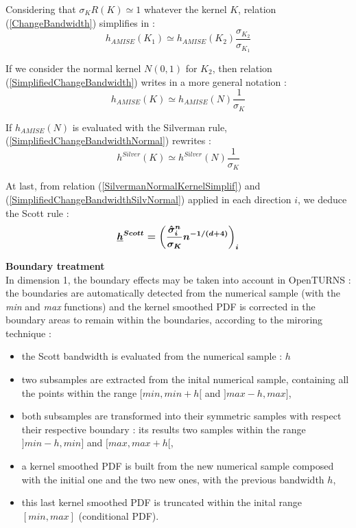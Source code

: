 {  Considering that $\sigma_{K}R(K) \simeq 1$ whatever the kernel $K$,   relation (\ref{ChangeBandwidth}) simplifies in :
  \begin{equation}
    \label{SimplifiedChangeBandwidth}
    h_{AMISE}(K_1) \simeq h_{AMISE}(K_2)\frac{\sigma_{K_2}}{\sigma_{K_1}}
  \end{equation}





  If we consider the normal kernel $N(0,1)$ for $K_2$, then relation (\ref{SimplifiedChangeBandwidth}) writes in a more general notation :
  \begin{equation}
    \label{SimplifiedChangeBandwidthNormal}
    h_{AMISE}(K) \simeq h_{AMISE}(N)\frac{1}{\sigma_{K}}
  \end{equation}

  If $h_{AMISE}(N)$ is evaluated with the Silverman rule, (\ref{SimplifiedChangeBandwidthNormal}) rewrites :
  \begin{equation}
    \label{SimplifiedChangeBandwidthSilvNormal}
    h^{Silver}(K) \simeq h^{Silver}(N)\frac{1}{\sigma_{K}}
  \end{equation}



  At last, from relation (\ref{SilvermanNormalKernelSimplif}) and (\ref{SimplifiedChangeBandwidthSilvNormal}) applied in each direction $i$, we deduce the Scott rule :
  \begin{equation}
    \label{ScottRule}
    \boldsymbol{{\underline{h}}^{Scott} = \left(\frac{\hat{\sigma}_i^n}{\sigma_K}n^{-1/(d+4)}\right)_i}
  \end{equation}




  \vspace*{0.5cm}

  \textbf{Boundary treatment}\\


  In dimension 1, the boundary effects may be taken into account in OpenTURNS : the boundaries are automatically detected from the numerical sample (with the \textit{min} and \textit{max} functions) and the kernel smoothed PDF is corrected in the boundary areas to remain within the boundaries, according to the miroring technique :
  \begin{itemize}
  \item the Scott bandwidth is evaluated from the numerical sample : $h$
  \item two subsamples are extracted from the inital numerical sample, containing all the points within the range $[min, min + h[$ and  $]max-h, max]$,
  \item both subsamples are transformed into their symmetric samples with respect their respective boundary : its results two samples within the range  $]min-h, min]$ and  $[max, max+h[$,
    \item a kernel smoothed PDF is built from the new numerical sample composed with the initial one and the two new ones, with the previous bandwidth $h$,
    \item this last kernel smoothed PDF is truncated within the inital range  $[min, max]$ (conditional PDF).
  \end{itemize}



}
